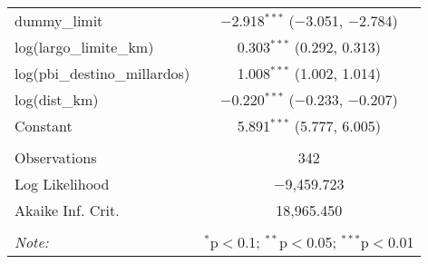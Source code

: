\begin{table}[H]
\begin{tabular}{@{\extracolsep{5pt}}lc}
  dummy\_limit & $-$2.918$^{***}$ ($-$3.051, $-$2.784) \\ 
  log(largo\_limite\_km) & 0.303$^{***}$ (0.292, 0.313) \\ 
  log(pbi\_destino\_millardos) & 1.008$^{***}$ (1.002, 1.014) \\ 
  log(dist\_km) & $-$0.220$^{***}$ ($-$0.233, $-$0.207) \\ 
  Constant & 5.891$^{***}$ (5.777, 6.005) \\ 
 \hline \\[-1.8ex] 
Observations & 342 \\ 
Log Likelihood & $-$9,459.723 \\ 
Akaike Inf. Crit. & 18,965.450 \\ 
\hline 
\hline \\[-1.8ex] 
\textit{Note:}  & \multicolumn{1}{r}{$^{*}$p$<$0.1; $^{**}$p$<$0.05; $^{***}$p$<$0.01} \\ 
\end{tabular} 
\end{table} 
